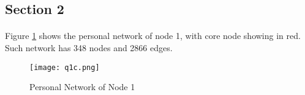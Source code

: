 \subsection*{Section 2}
\paragraph{}
Figure \ref{fig:c} shows the personal network of node 1, with core node showing in red. Such network has 348 nodes and 2866 edges.
\begin{figure}[h!]
	\centering
	\texttt{[image: q1c.png]}
	\caption{Personal Network of Node 1}	
	\label{fig:c}
\end{figure}